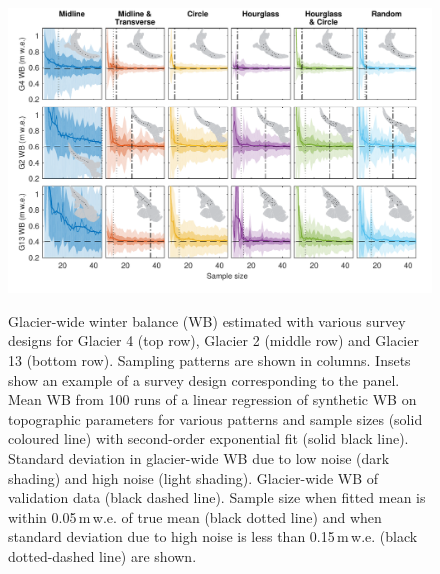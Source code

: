 \documentclass[twocolumn,letterpaper]{igs}
\begin{document}
\begin{figure}
	\centering
	\includegraphics[width =\textwidth]{SyntheticObsWB.pdf}\\
	\caption{Glacier-wide winter balance (WB) estimated with various survey designs for Glacier 4 (top row), Glacier 2 (middle row) and Glacier 13 (bottom row). Sampling patterns are shown in columns. Insets show an example of a survey design corresponding to the panel. Mean WB from 100 runs of a linear regression of synthetic WB on topographic parameters for various patterns and sample sizes (solid coloured line) with second-order exponential fit (solid black line). Standard deviation in glacier-wide WB due to low noise (dark shading) and high noise (light shading). Glacier-wide WB of validation data (black dashed line). Sample size when fitted mean is within 0.05\,m\,w.e. of true mean (black dotted line) and when standard deviation due to high noise is less than 0.15\,m\,w.e. (black dotted-dashed line) are shown.}
	\label{fig:SyntheticObsWB}
\end{figure}
\end{document}
